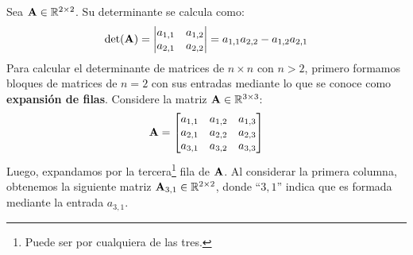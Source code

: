 \documentclass[12pt]{article}
\begin{document}
Sea $\mathbf{A} \in \mathbb{R}^{2 \times 2}$. Su determinante se calcula como:
\[
\det(\mathbf{A}) =
\begin{vmatrix}
a_{1, 1} & a_{1, 2} \\
a_{2, 1} & a_{2, 2}
\end{vmatrix} =
a_{1, 1}a_{2, 2} - a_{1, 2}a_{2, 1}
\]
Para calcular el determinante de matrices de $n \times n$ con $n > 2$, primero formamos bloques de matrices de $n = 2$ con sus entradas mediante lo que se conoce como \textbf{expansión de filas}. Considere la matriz $\mathbf{A} \in \mathbb{R}^{3 \times 3}$:
\[
\mathbf{A} =
\begin{bmatrix}
a_{1, 1} & a_{1, 2} & a_{1, 3} \\
a_{2, 1} & a_{2, 2} & a_{2, 3} \\
a_{3, 1} & a_{3, 2} & a_{3, 3}
\end{bmatrix}
\]
Luego, expandamos por la tercera\footnote{Puede ser por cualquiera de las tres.} fila de $\mathbf{A}$. Al considerar la primera columna, obtenemos la siguiente matriz $\mathbf{A}_{3, 1} \in \mathbb{R}^{2 \times 2}$, donde ``$3, 1$'' indica que es formada mediante la entrada $a_{3, 1}$.

\begin{figure}[hbt!]
\centering


\end{figure}
\end{document}
